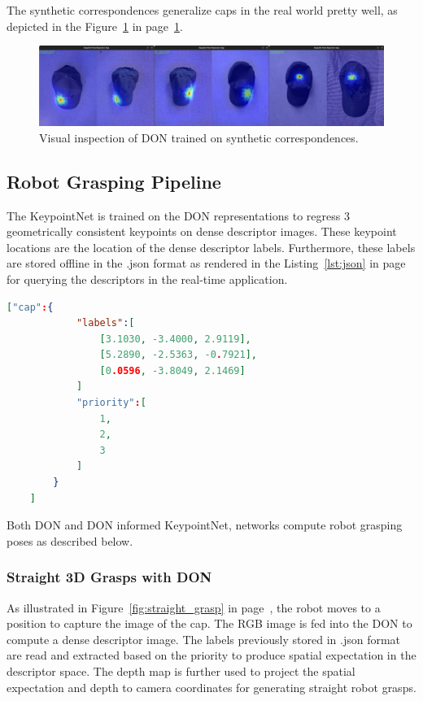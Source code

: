 The synthetic correspondences generalize caps in the real world pretty well, as depicted in the Figure~\ref{fig:real_heatmaps} in page~\ref{fig:real_heatmaps}.

\begin{figure}[htb]
    \centering
    \caption{Visual inspection of \ac{DON} trained on synthetic correspondences.}
    \label{fig:real_heatmaps}
    \includegraphics[scale=0.2]{images/cap/real_heatmap.png}
\end{figure}


\subsection{Robot Grasping Pipeline}

The KeypointNet is trained on the \ac{DON} representations to regress 3 geometrically consistent keypoints on dense descriptor images. These keypoint locations are the location of the dense descriptor labels.
Furthermore, these labels are stored offline in the .json format as rendered in the Listing~\ref{lst:json} in page~\pageref{lst:json}
for querying the descriptors in the real-time application.

\begin{lstlisting}[language=json, firstnumber=1, caption=Preview of json file entry of offline stored descriptors., label={lst:json}]
    ["cap":{
            "labels":[
                [3.1030, -3.4000, 2.9119],
                [5.2890, -2.5363, -0.7921],
                [0.0596, -3.8049, 2.1469]
            ]
            "priority":[
                1,
                2,
                3
            ]
        }
    ]
\end{lstlisting}

Both \ac{DON} and \ac{DON} informed KeypointNet, networks compute robot grasping poses as described below.

\subsubsection{Straight 3D Grasps with \ac{DON}}

As illustrated in Figure~\ref{fig:straight_grasp} in page~\pageref{fig:straight_grasp}, the robot moves to a position to capture the image of the cap. The \ac{RGB} image is fed into the \ac{DON} to compute a dense descriptor image.
The labels previously stored in .json format are read and extracted based on the priority to produce spatial expectation in the descriptor space.
The depth map is further used to project the spatial expectation and depth to camera coordinates for generating straight robot grasps.

